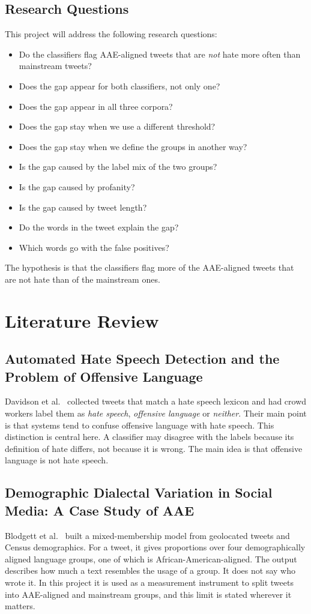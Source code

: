 \documentclass[runningheads,a4paper,oribibl]{llncs}
\begin{document}
\subsection{Research Questions}
This project will address the following research questions:
\begin{itemize}
  \item Do the classifiers flag AAE-aligned tweets that are \emph{not} hate more often than mainstream tweets?
  \item Does the gap appear for both classifiers, not only one?
  \item Does the gap appear in all three corpora?
  \item Does the gap stay when we use a different threshold?
  \item Does the gap stay when we define the groups in another way?
  \item Is the gap caused by the label mix of the two groups?
  \item Is the gap caused by profanity?
  \item Is the gap caused by tweet length?
  \item Do the words in the tweet explain the gap?
  \item Which words go with the false positives?
\end{itemize}
The hypothesis is that the classifiers flag more of the AAE-aligned tweets that are not hate
than of the mainstream ones.

\section{Literature Review}

\subsection{Automated Hate Speech Detection and the Problem of Offensive Language}
Davidson et al.~\cite{davidson2017} collected tweets that match a hate speech lexicon and had
crowd workers label them as \emph{hate speech}, \emph{offensive language} or \emph{neither}.
Their main point is that systems tend to confuse offensive language with hate speech. This
distinction is central here. A classifier may disagree with the labels because its definition
of hate differs, not because it is wrong. The main idea is that offensive language is not hate speech.

\subsection{Demographic Dialectal Variation in Social Media: A Case Study of AAE}
Blodgett et al.~\cite{blodgett2016} built a mixed-membership model from geolocated tweets and
Census demographics. For a tweet, it gives proportions over four demographically aligned language
groups, one of which is African-American-aligned. The output describes how much a text resembles
the usage of a group. It does not say who wrote it. In this project it is used as a measurement
instrument to split tweets into AAE-aligned and mainstream groups, and this limit is stated wherever it matters.
\end{document}
